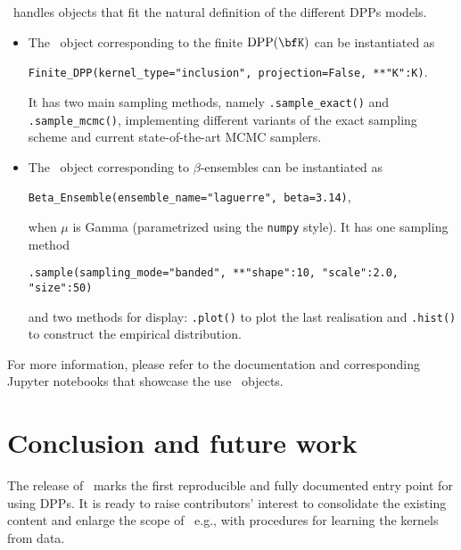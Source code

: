 \documentclass[twoside,11pt]{article}
\begin{document}
  \DPPy\ handles objects that fit the natural definition of the different DPPs models.
  \begin{itemize}
	  \item The \DPPy\ object corresponding to the finite $\DPP(\bfK)$ can be instantiated as
	  \begin{nscenter}
	  	\texttt{Finite_DPP(kernel_type="inclusion", projection=False, **{"K":K})}.
	  \end{nscenter}
		It has two main sampling methods, namely \texttt{.sample_exact()} and \texttt{.sample_mcmc()}, implementing different variants of the exact sampling scheme and current state-of-the-art MCMC samplers.

		\item The \DPPy\ object corresponding to $\beta$-ensembles can be instantiated as
		\begin{nscenter}
			\texttt{Beta_Ensemble(ensemble_name="laguerre", beta=3.14)},
		\end{nscenter}
		when $\mu$ is Gamma (parametrized using the \texttt{numpy} style).
		It has one sampling method
		\begin{nscenter}
			\texttt{.sample(sampling_mode="banded", **{"shape":10, "scale":2.0, "size":50})}
		\end{nscenter}
		and two methods for display: \texttt{.plot()} to plot the last realisation and \texttt{.hist()} to construct the empirical distribution.
  \end{itemize}

  For more information, please refer to the documentation and corresponding Jupyter notebooks that showcase the use \DPPy\ objects.


\section{Conclusion and future work} %
\label{sec:conclusion_and_future_work}

	The release of \DPPy\ marks the first reproducible and fully documented entry point for using DPPs. It is ready to raise contributors' interest to consolidate the existing content and enlarge the scope of \DPPy\ e.g., with procedures for learning the kernels from data.

\end{document}
